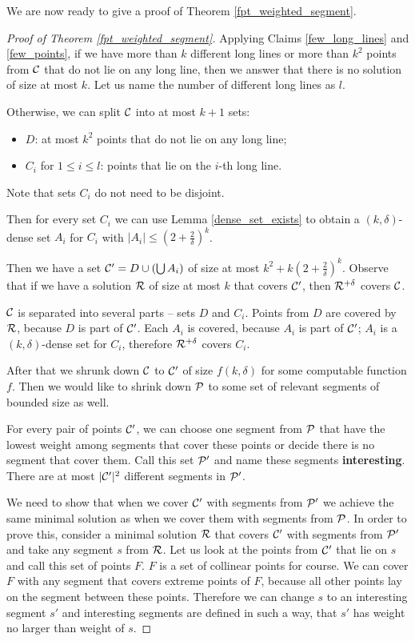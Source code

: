 We are now ready to give a proof of Theorem \ref{fpt_weighted_segment}.

\begin{proof}[Proof of Theorem \ref{fpt_weighted_segment}]

Applying Claims \ref{few_long_lines} and \ref{few_points},
if we have more than $k$ different long lines
or more than $k^2$ points from $\mathcal{C}$
that do not lie on any long line, then we answer that
there is no solution of size at most $k$.
Let us name the number of different long lines as $l$.

Otherwise, we can split $\mathcal{C}$ into at most $k+1$ sets:
\begin{itemize}
\item $D$: at most $k^2$ points that do not lie on any long line;
\item $C_i$ for $1 \le i \le l$: points that lie on the $i$-th long line.
\end{itemize}
Note that sets $C_i$ do not need to be disjoint.

Then for every set $C_i$ we can use Lemma \ref{dense_set_exists}
to obtain a $(k,\delta)$-dense set $A_i$
for $C_i$ with $|A_i| \le (2+\frac{2}{\delta})^k$.

Then we have a set $\mathcal{C}' = D \cup (\bigcup A_i)$ of size at most
$k^2 + k(2+\frac{2}{\delta})^k$.
Observe that if we have a solution $\mathcal{R}$ of size at most $k$
that covers $\mathcal{C}'$, then $\mathcal{R}^{+\delta}$ covers $\mathcal{C}$.

$\mathcal{C}$ is separated into several parts -- sets $D$ and $C_i$.
Points from $D$ are covered by $\mathcal{R}$, because $D$ is part of $\mathcal{C}'$.
Each $A_i$ is covered, because $A_i$ is part of $\mathcal{C}'$;
$A_i$ is a $(k,\delta)$-dense set for $C_i$, therefore $\mathcal{R}^{+\delta}$ covers $C_i$.

After that we shrunk down $\mathcal{C}$ to $\mathcal{C}'$ of size $f(k, \delta)$
for some computable function $f$.
Then we would like to shrink down $\mathcal{P}$ to some set of
relevant segments of bounded size as well.

For every pair of points $\mathcal{C}'$, we can choose one segment from
$\mathcal{P}$ that have the lowest weight
among segments that cover these points 
or decide there is no segment that cover them.
Call this set $\mathcal{P}'$ and name these segments \textbf{interesting}.
There are at most $|\mathcal{C}'|^2$ different segments in $\mathcal{P}'$.

We need to show that when we cover $\mathcal{C}'$
with segments from $\mathcal{P}'$ we achieve the same minimal
solution as when we cover them with segments from $\mathcal{P}$. 
In order to prove this,
consider a minimal solution $\mathcal{R}$ that covers $\mathcal{C}'$
with segments from $\mathcal{P}'$
and take any segment $s$ from $\mathcal{R}$.
Let us look at the points from $\mathcal{C}'$ that lie on $s$
and call this set of points $F$.
$F$ is a set of collinear points for course.
We can cover $F$ with any segment that covers extreme points of $F$,
because all other points lay on the segment between these points.
Therefore we can change $s$ to an interesting segment $s'$
and interesting segments are defined in such a way, that $s'$
has weight no larger than weight of $s$.


\end{proof}
